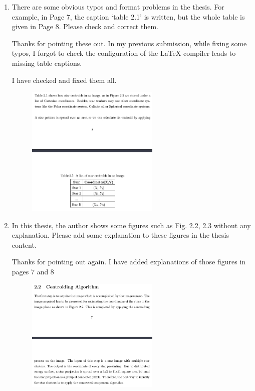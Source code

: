 \documentclass[dvips,a4paper,12pt]{article}
\begin{document}
\begin{enumerate}
    \color{blue}
    \item There are some obvious typos and format problems in the thesis. For example, in Page 7, the caption ‘table 2.1’ is written, but the whole table is given in Page 8. Please check and correct them.

    \color{black}
    Thanks for pointing these out. In my previous submission, while fixing some typos, I forgot to check the configuration of the LaTeX compiler leads to missing table captions.

    I have checked and fixed them all. \\

    \begin{figure}[H]
        \centering
        \includegraphics[width=0.6\textwidth]{1}
    \end{figure}

    \color{blue}
    \item In this thesis, the author shows some figures such as Fig. 2.2, 2.3 without any explanation. Please add some explanation to these figures in the thesis content.

    \color{black}
    Thanks for pointing out again. I have added explanations of those figures in pages 7 and 8
    
    \begin{figure}[H]
        \centering
        \includegraphics[width=0.6\textwidth]{2}
    \end{figure}


\end{enumerate}
\end{document}
